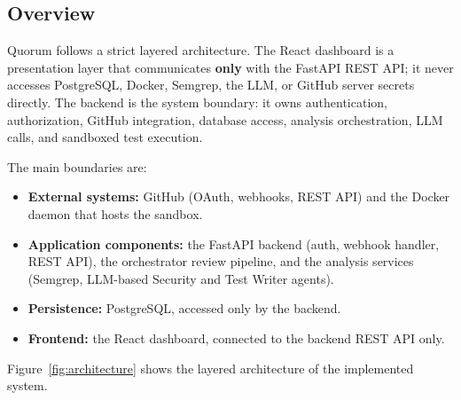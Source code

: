 \subsection{Overview}

Quorum follows a strict layered architecture. The React dashboard is a
presentation layer that communicates \textbf{only} with the FastAPI REST API;
it never accesses PostgreSQL, Docker, Semgrep, the LLM, or GitHub server
secrets directly. The backend is the system boundary: it owns authentication,
authorization, GitHub integration, database access, analysis orchestration,
LLM calls, and sandboxed test execution.

The main boundaries are:

\begin{itemize}
  \item \textbf{External systems:} GitHub (OAuth, webhooks, REST API) and the
        Docker daemon that hosts the sandbox.
  \item \textbf{Application components:} the FastAPI backend (auth, webhook
        handler, REST API), the orchestrator review pipeline, and the analysis
        services (Semgrep, LLM-based Security and Test Writer agents).
  \item \textbf{Persistence:} PostgreSQL, accessed only by the backend.
  \item \textbf{Frontend:} the React dashboard, connected to the backend REST
        API only.
\end{itemize}

Figure~\ref{fig:architecture} shows the layered architecture of the
implemented system.

